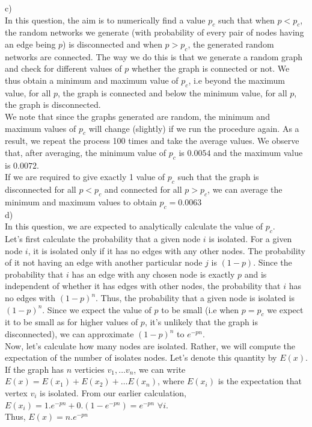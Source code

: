 \documentclass{article}
\begin{document}
c)\\
In this question, the aim is to numerically find a value $p_c$ such that when $p<p_c$, the random networks we 
generate (with probability of every pair of nodes having an edge being $p$) is disconnected and when 
$p>p_c$, the generated random networks are connected. The way we do this is that we generate a random graph and 
check for different values of $p$ whether the graph is connected or not. We thus obtain a minimum and maximum value of 
$p_c$, i.e beyond the maximum value, for all $p$, the graph is connected and below the minimum value,
for all $p$, the graph is disconnected.\\
We note that since the graphs generated are random, the minimum and maximum values of $p_c$ will change (slightly)
if we run the procedure again. As a result, we repeat the process 100 times and take the average values.
We observe that, after averaging, the minimum value of $p_c$ is $0.0054$ and the maximum value is $0.0072$.\\
If we are required to give exactly 1 value of $p_c$ such that the graph is disconnected for all $p<p_c$ and connected
for all $p>p_c$, we can average the minimum and maximum values to obtain $p_c=0.0063$\\

d)\\
In this question, we are expected to analytically calculate the value of $p_c$.\\
Let's first calculate the probability that a given node $i$ is isolated. For a given node $i$, it is isolated only if
it has no edges with any other nodes. The probability of it not having an edge with another particular node $j$ is 
$(1-p)$. Since the probability that $i$ has an edge with any chosen node is exactly $p$ and is independent of whether it
has edges with other nodes, the probability that $i$ has no edges with $(1-p)^n$. Thus, the probability that a given 
node is isolated is $(1-p)^n$. Since we expect the value of $p$ to be small (i.e 
when $p=p_c$ we expect it to be small as for higher values of $p$, it's unlikely that the graph is disconnected),
we can approximate $(1-p)^n$ to $e^{-pn}$.\\
Now, let's calculate how many nodes are isolated. Rather, we will compute the expectation of the number of isolates nodes. 
Let's denote this quantity by $E(x)$.\\
If the graph has $n$ verticies $v_1,\ldots v_n$, we can write $E(x) = E(x_1) + E(x_2) + \ldots E(x_n)$, where
$E(x_i)$ is the expectation that vertex $v_i$ is isolated. From our earlier calculation, 
$E(x_i) = 1.e^{-pn} + 0.(1- e^{-pn}) = e^{-pn}$ $\forall i$. \\
Thus, $E(x) = n.e^{-pn}$\\
\end{document}
